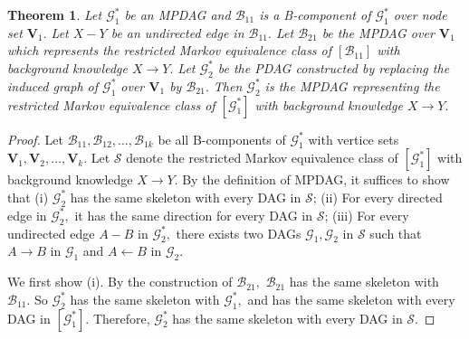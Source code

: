 \documentclass{article}
\newtheorem{theorem}{Theorem}
\begin{document}
\begin{theorem}
\label{thm:local orientation}
Let $\mathcal{G}^*_1$ be an MPDAG and $\mathcal{B}_{11}$ is a B-component of $\mathcal{G}^*_1$ over node set $\mathbf{V}_1.$ Let $X-Y$ be an undirected edge in $\mathcal{B}_{11}.$ Let $\mathcal{B}_{21}$ be the MPDAG over $\mathbf{V}_1$ which represents the restricted Markov equivalence class of $[\mathcal{B}_{11}]$ with background knowledge $X\to Y.$ Let $\mathcal{G}^*_2$ be the PDAG constructed by replacing the induced graph of $\mathcal{G}^*_1$ over $\mathbf{V}_1$ by $\mathcal{B}_{21}.$ Then $\mathcal{G}^*_2$ is the MPDAG representing the restricted Markov equivalence class of $[\mathcal{G}^*_1]$ with background knowledge $X\to Y.$
\end{theorem}
\begin{proof}
Let $\mathcal{B}_{11},\mathcal{B}_{12},\dots,\mathcal{B}_{1k}$ be all B-components of $\mathcal{G}^*_1$ with vertice sets $\mathbf{V}_1,\mathbf{V}_2,\dots,\mathbf{V}_k.$ Let $\mathcal{S}$ denote the restricted Markov equivalence class of $[\mathcal{G}^*_1]$ with background knowledge $X\to Y.$ By the definition of MPDAG, it suffices to show that (i) $\mathcal{G}^*_2$ has the same skeleton with every DAG in $\mathcal{S}$; (ii) For every directed edge in $\mathcal{G}^*_2,$ it has the same direction for every DAG in $\mathcal{S}$; (iii) For every undirected edge $A-B$ in $\mathcal{G}^*_2,$ there exists two DAGs $\mathcal{G}_1,\mathcal{G}_2$ in $\mathcal{S}$ such that $A\to B$ in $\mathcal{G}_1$ and $A\leftarrow B$ in $\mathcal{G}_2.$

We first show (i). By the construction of $\mathcal{B}_{21},$ $\mathcal{B}_{21}$ has the same skeleton with $\mathcal{B}_{11}.$ So $\mathcal{G}^*_2$ has the same skeleton with $\mathcal{G}^*_1,$ and has the same skeleton with every DAG in $[\mathcal{G}^*_1].$ Therefore, $\mathcal{G}^*_2$ has the same skeleton with every DAG in $\mathcal{S}.$


\end{proof}
\end{document}
